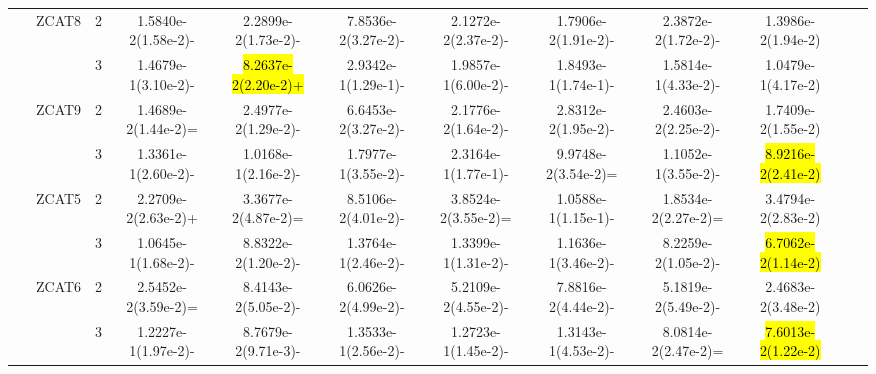 \documentclass[a4paper,fleqn]{cas-dc}
\newcommand{\highlight}[1]{
	\begingroup
	\sethlcolor{Seashell}%
	\hl{#1}%
	\endgroup
}
\begin{document}
\begin{sloppypar}
\begin{table}[ht]
{\begin{tabular}{cccccccccccc}
					
					
					\multirow{8}{*}{~}&\multirow{2}{*}{ZCAT8}&2 &1.5840e-2(1.58e-2)-	&2.2899e-2(1.73e-2)- 	&7.8536e-2(3.27e-2)-	&2.1272e-2(2.37e-2)-	&1.7906e-2(1.91e-2)-	&2.3872e-2(1.72e-2)-	&1.3986e-2(1.94e-2)\\	
					
					
					\multirow{8}{*}{~}&\multirow{2}{*}{~}&3		&1.4679e-1(3.10e-2)-		&\highlight{8.2637e-2(2.20e-2)+}	&2.9342e-1(1.29e-1)-	&1.9857e-1(6.00e-2)-	&1.8493e-1(1.74e-1)-	&1.5814e-1(4.33e-2)-	&1.0479e-1(4.17e-2)\\
					
					
					
					
					
					\multirow{8}{*}{~}&\multirow{2}{*}{ZCAT9}&2 	&1.4689e-2(1.44e-2)=	&2.4977e-2(1.29e-2)-	&6.6453e-2(3.27e-2)-	&2.1776e-2(1.64e-2)-	&2.8312e-2(1.95e-2)-	&2.4603e-2(2.25e-2)-	&1.7409e-2(1.55e-2)\\
					
					\multirow{8}{*}{~}&\multirow{2}{*}{~}&3	 &1.3361e-1(2.60e-2)-	&1.0168e-1(2.16e-2)-	&1.7977e-1(3.55e-2)-	&2.3164e-1(1.77e-1)-	&9.9748e-2(3.54e-2)=	&1.1052e-1(3.55e-2)-	&\highlight{8.9216e-2(2.41e-2)}\\
					\hline
					
					
					
					
					
					
					
					
					\multirow{8}{*}{Flat}&\multirow{2}{*}{ZCAT5}&2 &2.2709e-2(2.63e-2)+ &3.3677e-2(4.87e-2)=	&8.5106e-2(4.01e-2)-	&3.8524e-2(3.55e-2)=	&1.0588e-1(1.15e-1)-	&1.8534e-2(2.27e-2)=	&3.4794e-2(2.83e-2)\\
					\multirow{8}{*}{~}&\multirow{2}{*}{~}&3  &1.0645e-1(1.68e-2)- &8.8322e-2(1.20e-2)-	&1.3764e-1(2.46e-2)-	&1.3399e-1(1.31e-2)-	&1.1636e-1(3.46e-2)-	&8.2259e-2(1.05e-2)-	&\highlight{6.7062e-2(1.14e-2)}\\
					
					
					
					\multirow{8}{*}{~}&\multirow{2}{*}{ZCAT6}&2	&2.5452e-2(3.59e-2)=	&8.4143e-2(5.05e-2)-	&6.0626e-2(4.99e-2)-	&5.2109e-2(4.55e-2)-	&7.8816e-2(4.44e-2)-	&5.1819e-2(5.49e-2)-	&2.4683e-2(3.48e-2)\\
					
					\multirow{8}{*}{~}&\multirow{2}{*}{~}&3		&1.2227e-1(1.97e-2)-	&8.7679e-2(9.71e-3)-	&1.3533e-1(2.56e-2)-	&1.2723e-1(1.45e-2)-	&1.3143e-1(4.53e-2)-	&8.0814e-2(2.47e-2)=	&\highlight{7.6013e-2(1.22e-2)}\\
					

\end{tabular}}
\end{table}
\end{sloppypar}
\end{document}
